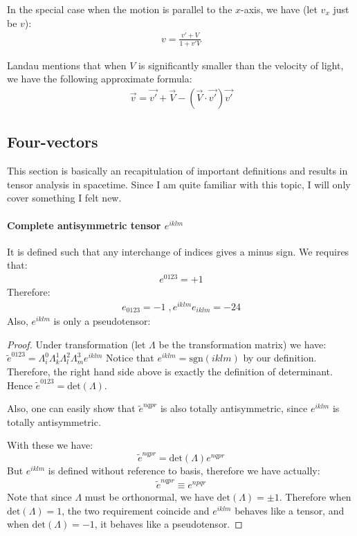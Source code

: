 \documentclass{article}
\numberwithin{equation}{subsection} %
\theoremstyle{definition}
\begin{document}
    In the special case when the motion is parallel to the $x$-axis,
    we have (let $v_x$ just be $v$):
    \begin{align}
        v = \frac{v'+V}{1+v' V}
    \end{align}
    
    Landau mentions that when $V$ is significantly smaller than the
    velocity of light, we have the following approximate formula:
    \begin{align}
        \vec{v} = \vec{v'} + \vec{V} - (\vec{V}\cdot\vec{v'}) \vec{v'}
    \end{align}


    \subsection{Four-vectors}
    \label{sec:Four-vectors}
    
    This section is basically an recapitulation of important definitions
    and results in tensor analysis in spacetime. Since I am quite
    familiar with this topic, I will only cover something I felt new.

    \paragraph{Complete antisymmetric tensor $e^{iklm}$}
    It is defined such that any interchange of indices gives a minus
    sign. We requires that:
    \begin{align}
        e^{0123}= +1
    \end{align}
    Therefore:
    \begin{align*}
        e_{0123}= -1\;, e^{iklm}e_{iklm}= -24
    \end{align*}
    Also, $e^{iklm}$ is only a pseudotensor:
    \begin{proof}
        Under transformation (let $\Lambda$ be the transformation matrix)
        we have:
        $\tilde{e}^{0123}=
          \Lambda^{0}_{i}\Lambda^{1}_{k}\Lambda^{2}_{l}\Lambda^{3}_{m}
          e^{iklm}$
        Notice that $e^{iklm}=\mathrm{sgn}(iklm)$ by our definition.
        Therefore, the right hand side above is exactly the definition
        of determinant. Hence $\tilde{e}^{0123}=\mathrm{det}(\Lambda)$.

        Also, one can easily show that $\tilde{e}^{nqpr}$ is also
        totally antisymmetric, since $e^{iklm}$ is totally antisymmetric.

        With these we have:
        $$
            \tilde{e}^{nqpr}=\mathrm{det}(\Lambda)e^{nqpr}
        $$
        But $e^{iklm}$ is defined without reference to basis, therefore
        we have actually:
        \begin{align}
            \tilde{e}^{nqpr} \equiv e^{npqr}
        \end{align}
        Note that since $\Lambda$ must be orthonormal, we have 
        $\mathrm{det}(\Lambda)=\pm 1$. Therefore when
        $\mathrm{det}(\Lambda)=1$, the two requirement coincide and
        $e^{iklm}$ behaves like a tensor, and when 
        $\mathrm{det}(\Lambda)=-1$, it behaves like a pseudotensor.
    \end{proof}
    
\end{document}
